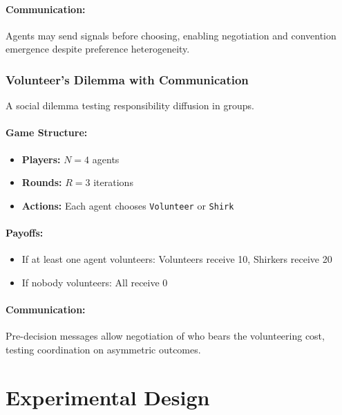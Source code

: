 \paragraph{Communication:}
Agents may send signals before choosing, enabling negotiation and convention emergence despite preference heterogeneity.

\subsubsection{Volunteer's Dilemma with Communication}

A social dilemma testing responsibility diffusion in groups.

\paragraph{Game Structure:}
\begin{itemize}
    \item \textbf{Players:} $N = 4$ agents
    \item \textbf{Rounds:} $R = 3$ iterations
    \item \textbf{Actions:} Each agent chooses \texttt{Volunteer} or \texttt{Shirk}
\end{itemize}

\paragraph{Payoffs:}
\begin{itemize}
    \item If at least one agent volunteers: Volunteers receive 10, Shirkers receive 20
    \item If nobody volunteers: All receive 0
\end{itemize}

\paragraph{Communication:}
Pre-decision messages allow negotiation of who bears the volunteering cost, testing coordination on asymmetric outcomes.


\section{Experimental Design}

